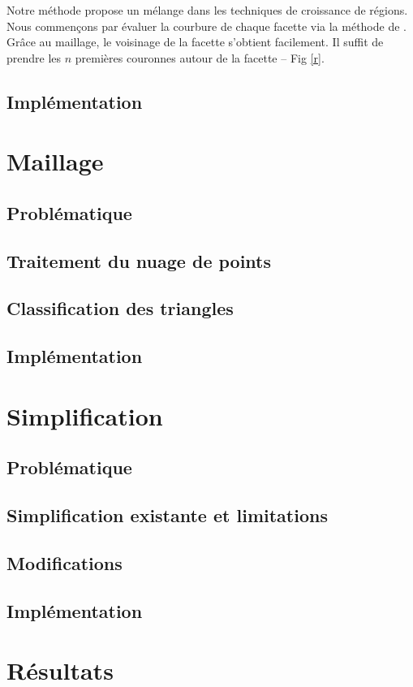 \documentclass[12pt, twoside]{article}
\let\oldsection\section
\def\section{\cleardoublepage\oldsection}
\begin{document}
Notre méthode propose un mélange dans les techniques de croissance de régions. Nous commençons par évaluer la courbure de chaque facette via la méthode de \cite{reggrow3}. Grâce au maillage, le voisinage de la facette s'obtient facilement. Il suffit de prendre les $n$ premières couronnes autour de la facette -- Fig \ref{r}.

\subsection{Implémentation}

\section{Maillage}
\subsection{Problématique}
\subsection{Traitement du nuage de points}
\subsection{Classification des triangles}
\subsection{Implémentation}

\section{Simplification}
\subsection{Problématique}
\subsection{Simplification existante et limitations}
\subsection{Modifications}
\subsection{Implémentation}

\section{Résultats}
\end{document}
